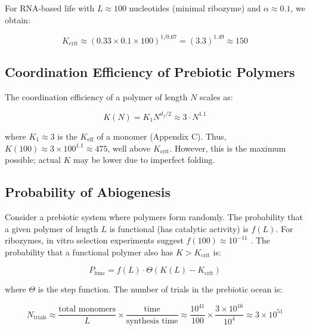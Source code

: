 \documentclass[12pt,a4paper]{article}
\theoremstyle{remark}
\newcommand{\Keff}{K_{\mathrm{eff}}}
\newcommand{\df}{d_{\!f}}
\newcommand{\Ntrials}{N_{\mathrm{trials}}}
\begin{document}
	For RNA-based life with $L \approx 100$ nucleotides (minimal ribozyme) and $\alpha \approx 0.1$, we obtain:
	
	\begin{equation}
		K_{\text{crit}} \approx (0.33 \times 0.1 \times 100)^{1/0.67} = (3.3)^{1.49} \approx 150
		\label{eq:Kcrit-life-num}
	\end{equation}
	
	\subsection{Coordination Efficiency of Prebiotic Polymers}
	
	The coordination efficiency of a polymer of length $N$ scales as:
	
	\begin{equation}
		K(N) = K_1 N^{\df/2} \approx 3 \cdot N^{1.1}
		\label{eq:K-polymer}
	\end{equation}
	
	where $K_1 \approx 3$ is the $\Keff$ of a monomer (Appendix C). Thus, $K(100) \approx 3 \times 100^{1.1} \approx 475$, well above $K_{\text{crit}}$. However, this is the maximum possible; actual $K$ may be lower due to imperfect folding.
	
	\subsection{Probability of Abiogenesis}
	
	Consider a prebiotic system where polymers form randomly. The probability that a given polymer of length $L$ is functional (has catalytic activity) is $f(L)$. For ribozymes, in vitro selection experiments suggest $f(100) \approx 10^{-11}$ \cite{Joyce2002}. The probability that a functional polymer also has $K > K_{\text{crit}}$ is:
	
	\begin{equation}
		P_{\text{func}} = f(L) \cdot \Theta(K(L) - K_{\text{crit}})
		\label{eq:Pfunc}
	\end{equation}
	
	where $\Theta$ is the step function. The number of trials in the prebiotic ocean is:
	
	\begin{equation}
		\Ntrials \approx \frac{\text{total monomers}}{L} \times \frac{\text{time}}{\text{synthesis time}} \approx \frac{10^{41}}{100} \times \frac{3\times 10^{16}}{10^4} \approx 3 \times 10^{51}
		\label{eq:trials}
	\end{equation}
	
\end{document}
